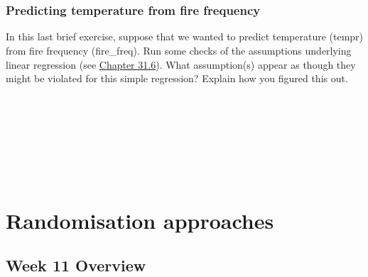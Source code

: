 \documentclass[
]{scrbook}
\begin{document}
\begin{verbatim}



\end{verbatim}

\hypertarget{predicting-temperature-from-fire-frequency}{%
\section{Predicting temperature from fire frequency}\label{predicting-temperature-from-fire-frequency}}

In this last brief exercise, suppose that we wanted to predict temperature (tempr) from fire frequency (fire\_freq).
Run some checks of the assumptions underlying linear regression (see \protect\hyperlink{regression-assumptions}{Chapter 31.6}).
What assumption(s) appear as though they might be violated for this simple regression?
Explain how you figured this out.

\begin{verbatim}







\end{verbatim}

\hypertarget{part-randomisation-approaches}{%
\part{Randomisation approaches}\label{part-randomisation-approaches}}

\hypertarget{Week11}{%
\chapter*{Week 11 Overview}\label{Week11}}
\end{document}
